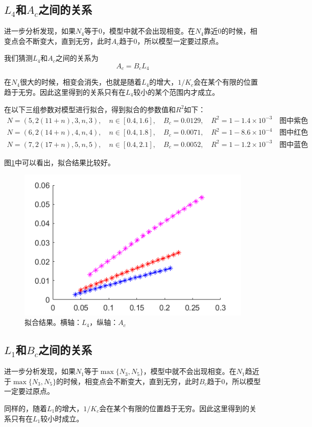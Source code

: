 \documentclass[12pt,a4paper]{article}
\begin{document}
\subsection*{$L_4$和$A_c$之间的关系}

进一步分析发现，如果$N_4$等于$0$，模型中就不会出现相变。在$N_4$靠近0的时候，相变点会不断变大，直到无穷，此时$A_c$趋于0，所以模型一定要过原点。

我们猜测$L_4$和$A_c$之间的关系为
$$ A_c = B_c L_4 $$

在$N_4$很大的时候，相变会消失，也就是随着$L_4$的增大，$1/K_c$会在某个有限的位置趋于无穷。因此这里得到的关系只有在$L_4$较小的某个范围内才成立。

在以下三组参数对模型进行拟合，得到拟合的参数值和$R^2$如下：
\begin{align*}
N=(5, 2(11+n), 3, n, 3), \quad n \in [0.4, 1.6], \quad B_c = 0.0129, \quad R^2 = 1 - 1.4 \times 10^{-3} \quad \text{图中紫色} \\
N=(6, 2(14+n), 4, n, 4), \quad n \in [0.4, 1.8], \quad B_c = 0.0071, \quad R^2 = 1 - 8.6 \times 10^{-4} \quad \text{图中红色} \\
N=(7, 2(17+n), 5, n, 5), \quad n \in [0.4, 2.1], \quad B_c = 0.0052, \quad R^2 = 1 - 1.2 \times 10^{-3} \quad \text{图中蓝色}
\end{align*}

图\ref{fn4}中可以看出，拟合结果比较好。
\begin{figure}[h]
\centering
\includegraphics[width=0.4\linewidth]{L4Ac}
\caption{拟合结果。横轴：$L_4$，纵轴：$A_c$}
\label{fn4}
\end{figure}

\subsection*{$L_1$和$B_c$之间的关系}

进一步分析发现，如果$N_1$等于$\max\{N_3,N_5\}$，模型中就不会出现相变。在$N_1$趋近于$\max\{N_3,N_5\}$的时候，相变点会不断变大，直到无穷，此时$B_c$趋于0，所以模型一定要过原点。

同样的，随着$L_1$的增大，$1/K_c$会在某个有限的位置趋于无穷。因此这里得到的关系只有在$L_1$较小时成立。
\end{document}

